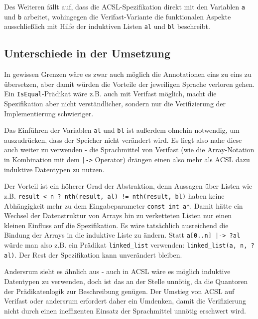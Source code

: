 Des Weiteren fällt auf, dass die ACSL-Spezifikation direkt mit den Variablen \lstinline{a} und
\lstinline{b} arbeitet, wohingegen die Verifast-Variante die funktionalen Aspekte ausschließlich
mit Hilfe der induktiven Listen \lstinline{al} und \lstinline{bl} beschreibt. 



\subsection{Unterschiede in der Umsetzung}

In gewissen Grenzen wäre es zwar auch möglich die Annotationen eins zu eins zu übersetzen, aber damit
würden die Vorteile der jeweiligen Sprache verloren gehen. Ein \lstinline{IsEqual}-Prädikat wäre z.B.
auch mit Verifast möglich, macht die Spezifikation aber nicht verständlicher, sondern nur die Verifizierung
der Implementierung schwieriger. 

Das Einführen der Variablen  \lstinline{al} und \lstinline{bl} ist außerdem
ohnehin notwendig, um auszudrücken, dass der Speicher nicht verändert wird. Es liegt also nahe diese auch
weiter zu verwenden - die Sprachmittel von Verifast (wie die Array-Notation in Kombination mit dem
\lstinline{|->} Operator) drängen einen also mehr als ACSL dazu induktive 
Datentypen zu nutzen.

Der Vorteil ist ein höherer Grad der Abstraktion, denn Aussagen über Listen wie z.B.
\lstinline{result < n ? nth(result, al) != nth(result, bl)} haben keine Abhängigkeit mehr zu
dem Eingabeparameter \lstinline{const int a*}. Damit hätte ein Wechsel der Datenstruktur von Arrays
hin zu verketteten Listen nur einen kleinen Einfluss auf die Spezifikation. Es wäre tatsächlich ausreichend
die Bindung der Arrays in die induktive Liste zu ändern. Statt \lstinline{a[0..n] |-> ?al} würde man also
z.B. ein Prädikat \lstinline{linked_list} verwenden: \lstinline{linked_list(a, n, ?al)}. Der Rest der 
Spezifikation kann unverändert bleiben.

Andersrum sieht es ähnlich aus - auch in ACSL wäre es möglich induktive Datentypen zu verwenden, doch
ist das an der Stelle unnötig, da die Quantoren der Prädikatenlogik zur Beschreibung genügen. 
Der Umstieg von ACSL auf Verifast oder andersrum erfordert daher ein Umdenken, damit die Verifizierung 
nicht durch einen ineffizenten Einsatz der Sprachmittel unnötig erschwert wird.

